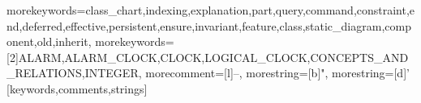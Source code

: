 \usepackage{color}
\usepackage{listings}


 
{morekeywords={class_chart,indexing,explanation,part,query,command,constraint,end,deferred,effective,persistent,ensure,invariant,feature,class,static_diagram,component,old,inherit},
morekeywords={[2]ALARM,ALARM_CLOCK,CLOCK,LOGICAL_CLOCK,CONCEPTS_AND_RELATIONS,INTEGER},
    morecomment=[l]{--},
    morestring=[b]",
    morestring=[d]'
  }[keywords,comments,strings]

